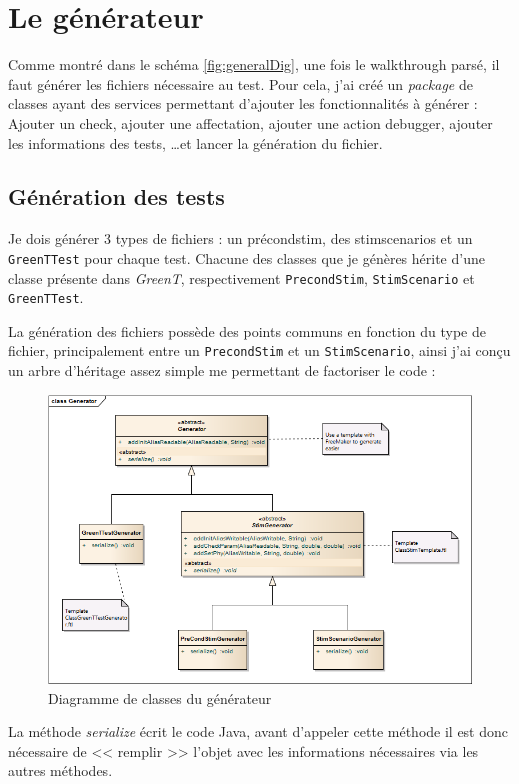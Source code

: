 	\section{Le générateur}
	Comme montré dans le schéma \ref{fig:generalDig}, une fois le walkthrough parsé, il faut générer les fichiers nécessaire au test. Pour cela, j'ai créé un \textit{package} de classes ayant des services permettant d'ajouter les fonctionnalités à générer : Ajouter un check, ajouter une affectation, ajouter une action debugger, ajouter les informations des tests, \ldots et lancer la génération du fichier.

		\subsection{Génération des tests}
		Je dois générer 3 types de fichiers : un précondstim, des stimscenarios et un \texttt{GreenTTest} pour chaque test. Chacune des classes que je génères hérite d'une classe présente dans \textit{GreenT}, respectivement \texttt{PrecondStim}, \texttt{StimScenario} et \texttt{GreenTTest}.

		La génération des fichiers possède des points communs en fonction du type de fichier, principalement entre un \texttt{PrecondStim} et un \texttt{StimScenario}, ainsi j'ai conçu un arbre d'héritage assez simple me permettant de factoriser le code : 
		\begin{figure}[H]
		\centering
		\includegraphics[width=14cm]{contents/images/generatorClass.png}
		\caption{Diagramme de classes du générateur}
		\end{figure}
		La méthode \textit{serialize} écrit le code Java, avant d'appeler cette méthode il est donc nécessaire de << remplir >> l'objet avec les informations nécessaires via les autres méthodes.
		
